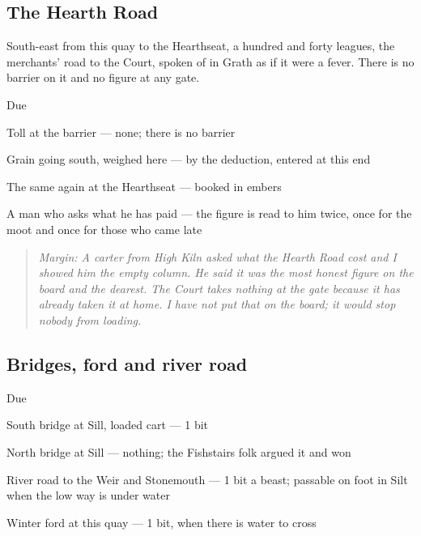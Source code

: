 \documentclass{design/chronicle}
\begin{document}
\subsection*{The Hearth Road}

South-east from this quay to the Hearthseat, a hundred and forty leagues, the merchants’ road to the Court, spoken of in Grath as if it were a fever. There is no barrier on it and no figure at any gate.

Due\par

Toll at the barrier — none; there is no barrier\par

Grain going south, weighed here — by the deduction, entered at this end\par

The same again at the Hearthseat — booked in embers\par

A man who asks what he has paid — the figure is read to him twice, once for the moot and once for those who came late\par

\begin{quote}\itshape \emph{Margin:} A carter from High Kiln asked what the Hearth Road cost and I showed him the empty column. He said it was the most honest figure on the board and the dearest. The Court takes nothing at the gate because it has already taken it at home. I have not put that on the board; it would stop nobody from loading.\end{quote}

\subsection*{Bridges, ford and river road}

Due\par

South bridge at Sill, loaded cart — 1 bit\par

North bridge at Sill — nothing; the Fishstairs folk argued it and won\par

River road to the Weir and Stonemouth — 1 bit a beast; passable on foot in Silt when the low way is under water\par

Winter ford at this quay — 1 bit, when there is water to cross\par
\end{document}

